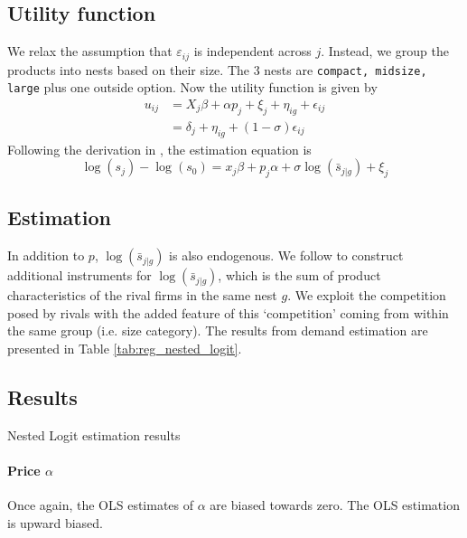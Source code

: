 \documentclass[12pt]{article}[margin=1in]
\begin{document}
\subsection{Utility function}
We relax the assumption that $\varepsilon_{ij}$ is independent across $j$.
Instead, we group the products into nests based on their size. The 3 nests are
\verb|compact, midsize, large| plus one outside option. Now the utility
function is given by
\begin{equation}
    \begin{split}
        u_{ij} & =X_{j}\beta + \alpha p_{j} + \xi_{j} + \eta_{ig} + \epsilon_{ij} \\
               & =\delta_j + \eta_{ig} + (1 - \sigma)\epsilon_{ij}
    \end{split}
\end{equation}
Following the derivation in \citet{berry1994estimating}, the estimation equation is
\begin{equation}
    \log(s_j) - \log(s_0) = x_j\beta + p_j\alpha + \sigma\log(\bar{s}_{j|g}) + \xi_j
\end{equation}

\subsection{Estimation}
In addition to $p$, $\log(\bar{s}_{j|g})$ is also endogenous. We follow
\citet{berry1994estimating} to construct additional instruments for
$\log(\bar{s}_{j|g})$, which is the sum of product characteristics of the rival
firms in the same nest $g$. We exploit the competition posed by rivals with the
added feature of this `competition' coming from within the same group (i.e.
size category). The results from demand estimation are presented in Table
\ref{tab:reg_nested_logit}.

\subsection{Results}

\begin{table}[h!]
    \fontsize{8pt}{10pt}\selectfont
    \centering
    
    \caption{Nested Logit estimation results}
    \label{tab:reg_nested_logit}
\end{table}

\paragraph{Price $\alpha$} Once again, the OLS estimates of $\alpha$ are biased towards zero. The OLS
estimation is upward biased.
\end{document}
